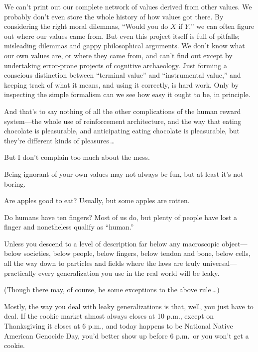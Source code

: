 {{
 We can't print out our complete network of values
derived from other values. We probably don't even store
the whole history of how values got there. By considering the right
moral dilemmas, ``Would you do $X$ if
$Y$,'' we can often figure out where our values came
from. But even this project itself is full of pitfalls; misleading
dilemmas and gappy philosophical arguments. We don't
know what our own values are, or where they came from, and
can't find out except by undertaking error-prone
projects of cognitive archaeology. Just forming a conscious distinction
between ``terminal value'' and
``instrumental value,'' and keeping
track of what it means, and using it correctly, is hard work. Only by
inspecting the simple formalism can we see how easy it ought to be, in
principle.}

{
 And that's to say nothing of all the other
complications of the human reward system---the whole use of
reinforcement architecture, and the way that eating chocolate is
pleasurable, and anticipating eating chocolate is pleasurable, but
they're different kinds of pleasures\,\ldots}

{
 But I don't complain too much about the mess.}

{
 Being ignorant of your own values may not always be fun, but at
least it's not boring.}

\myendsectiontext


{
 Are apples good to eat? Usually, but some apples are rotten. }

{
 Do humans have ten fingers? Most of us do, but plenty of people
have lost a finger and nonetheless qualify as
``human.''}

{
 Unless you descend to a level of description far below any
macroscopic object---below societies, below people, below fingers,
below tendon and bone, below cells, all the way down to particles and
fields where the laws are truly universal---practically every
generalization you use in the real world will be leaky.}

{
 (Though there may, of course, be some exceptions to the above rule\,\ldots)}

{
 Mostly, the way you deal with leaky generalizations is that, well,
you just have to deal. If the cookie market almost always closes at 10
p.m., except on Thanksgiving it closes at 6 p.m., and today happens to
be National Native American Genocide Day, you'd better
show up before 6 p.m.~or you won't get a cookie.}

}
